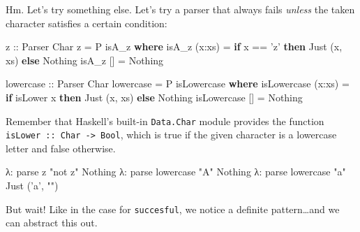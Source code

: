 \documentclass[]{article}
\newenvironment{Shaded}{}{}
\newcommand{\KeywordTok}[1]{\textcolor[rgb]{0.00,0.44,0.13}{\textbf{{#1}}}}
\newcommand{\DataTypeTok}[1]{\textcolor[rgb]{0.56,0.13,0.00}{{#1}}}
\newcommand{\CharTok}[1]{\textcolor[rgb]{0.25,0.44,0.63}{{#1}}}
\newcommand{\StringTok}[1]{\textcolor[rgb]{0.25,0.44,0.63}{{#1}}}
\newcommand{\OtherTok}[1]{\textcolor[rgb]{0.00,0.44,0.13}{{#1}}}
\newcommand{\FunctionTok}[1]{\textcolor[rgb]{0.02,0.16,0.49}{{#1}}}
\newcommand{\NormalTok}[1]{{#1}}
\begin{document}
Hm. Let's try something else. Let's try a parser that always fails \emph{unless} the taken character
satisfies a certain condition:

\begin{Shaded}
\begin{Highlighting}[]
\OtherTok{z ::} \DataTypeTok{Parser} \DataTypeTok{Char}
\NormalTok{z }\FunctionTok{=} \DataTypeTok{P} \NormalTok{isA_z}
    \KeywordTok{where}
        \NormalTok{isA_z (x}\FunctionTok{:}\NormalTok{xs) }\FunctionTok{=}  \KeywordTok{if} \NormalTok{x }\FunctionTok{==} \CharTok{'z'}
                            \KeywordTok{then} \DataTypeTok{Just} \NormalTok{(x, xs)}
                            \KeywordTok{else} \DataTypeTok{Nothing}
        \NormalTok{isA_z []     }\FunctionTok{=}  \DataTypeTok{Nothing}

\OtherTok{lowercase ::} \DataTypeTok{Parser} \DataTypeTok{Char}
\NormalTok{lowercase }\FunctionTok{=} \DataTypeTok{P} \NormalTok{isLowercase}
    \KeywordTok{where}
        \NormalTok{isLowercase (x}\FunctionTok{:}\NormalTok{xs)  }\FunctionTok{=}   \KeywordTok{if} \NormalTok{isLower x}
                                    \KeywordTok{then} \DataTypeTok{Just} \NormalTok{(x, xs)}
                                    \KeywordTok{else} \DataTypeTok{Nothing}
        \NormalTok{isLowercase []      }\FunctionTok{=}   \DataTypeTok{Nothing}
\end{Highlighting}
\end{Shaded}

Remember that Haskell's built-in \texttt{Data.Char} module provides the function
\texttt{isLower\ ::\ Char\ -\textgreater{}\ Bool}, which is true if the given character is a
lowercase letter and false otherwise.

\begin{Shaded}
\begin{Highlighting}[]
\NormalTok{λ}\FunctionTok{:} \NormalTok{parse z }\StringTok{"not z"}
\DataTypeTok{Nothing}
\NormalTok{λ}\FunctionTok{:} \NormalTok{parse lowercase }\StringTok{"A"}
\DataTypeTok{Nothing}
\NormalTok{λ}\FunctionTok{:} \NormalTok{parse lowercase }\StringTok{"a"}
\DataTypeTok{Just} \NormalTok{(}\CharTok{'a'}\NormalTok{, }\StringTok{""}\NormalTok{)}
\end{Highlighting}
\end{Shaded}

But wait! Like in the case for \texttt{succesful}, we notice a definite pattern\ldots{}and we can
abstract this out.
\end{document}
